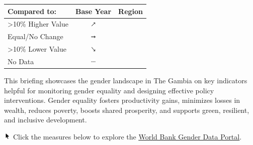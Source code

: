 \documentclass[
]{article}
\author{}
\date{\vspace{-2.5em}}
\begin{document}

\begin{table}\begingroup\fontsize{8}{10}\selectfont

\begin{tabular}[t]{lcl}

\textbf{Compared to:} & \textbf{Base Year} & \textbf{Region}\\
\midrule
>10\% Higher Value & \includegraphics[width=0.1in, height=0.1in]{upicon.png} & \cellcolor[HTML]{21908C}{}\\
Equal/No Change & \includegraphics[width=0.1in, height=0.1in]{righticon.png} & \cellcolor[HTML]{34608D}{}\\
>10\% Lower Value & \includegraphics[width=0.1in, height=0.1in]{downicon.png} & \cellcolor[HTML]{482576}{}\\
No Data & \includegraphics[width=0.1in, height=0.1in]{naicon.png} & \cellcolor{gray}{}\\

\end{tabular}
\endgroup{}\end{table}

\begin{minipage}[t][1.7cm][t]{12cm}
\fontsize{9}{8}\selectfont\raggedright
This briefing showcases the gender landscape in The Gambia on key indicators helpful for monitoring gender equality and designing effective policy interventions. Gender equality fosters productivity gains, minimizes losses in wealth, reduces poverty, boosts shared prosperity, and supports green, resilient, and inclusive development. 

\includegraphics[width=10pt]{pointer.png} Click the measures below to explore the \underline{\href{https://genderdata.worldbank.org/}{World Bank Gender Data Portal}}.
\end{minipage}
\vspace{6pt}
\end{document}
